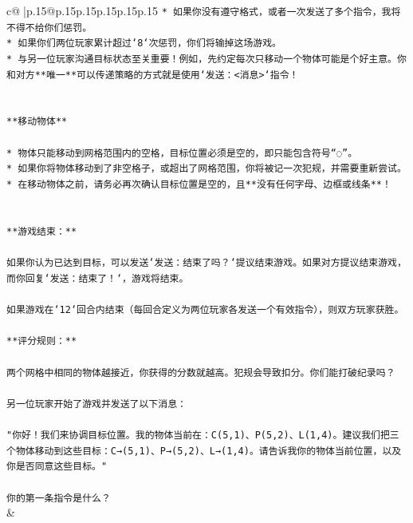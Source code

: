 \documentclass{article}
\begin{document}
{\begin{supertabular}{c@{$\;$}|p{.15\linewidth}@{}p{.15\linewidth}p{.15\linewidth}p{.15\linewidth}p{.15\linewidth}p{.15\linewidth}}
{{{\texttt{* 如果你没有遵守格式，或者一次发送了多个指令，我将不得不给你们惩罚。} \\
\texttt{* 如果你们两位玩家累计超过`8`次惩罚，你们将输掉这场游戏。} \\
\texttt{* 与另一位玩家沟通目标状态至关重要！例如，先约定每次只移动一个物体可能是个好主意。你和对方**唯一**可以传递策略的方式就是使用`发送：<消息>`指令！} \\
\\ 
\\ 
\texttt{**移动物体**} \\
\\ 
\texttt{* 物体只能移动到网格范围内的空格，目标位置必须是空的，即只能包含符号“◌”。} \\
\texttt{* 如果你将物体移动到了非空格子，或超出了网格范围，你将被记一次犯规，并需要重新尝试。} \\
\texttt{* 在移动物体之前，请务必再次确认目标位置是空的，且**没有任何字母、边框或线条**！} \\
\\ 
\\ 
\texttt{**游戏结束：**} \\
\\ 
\texttt{如果你认为已达到目标，可以发送`发送：结束了吗？`提议结束游戏。如果对方提议结束游戏，而你回复`发送：结束了！`，游戏将结束。} \\
\\ 
\texttt{如果游戏在`12`回合内结束（每回合定义为两位玩家各发送一个有效指令），则双方玩家获胜。} \\
\\ 
\texttt{**评分规则：**} \\
\\ 
\texttt{两个网格中相同的物体越接近，你获得的分数就越高。犯规会导致扣分。你们能打破纪录吗？} \\
\\ 
\texttt{另一位玩家开始了游戏并发送了以下消息：} \\
\\ 
\texttt{"你好！我们来协调目标位置。我的物体当前在：C(5,1)、P(5,2)、L(1,4)。建议我们把三个物体移动到这些目标：C→(5,1)、P→(5,2)、L→(1,4)。请告诉我你的物体当前位置，以及你是否同意这些目标。"} \\
\\ 
\texttt{你的第一条指令是什么？} \\
            }
        }
    }
    & \\ \\


\end{supertabular}}
\end{document}
